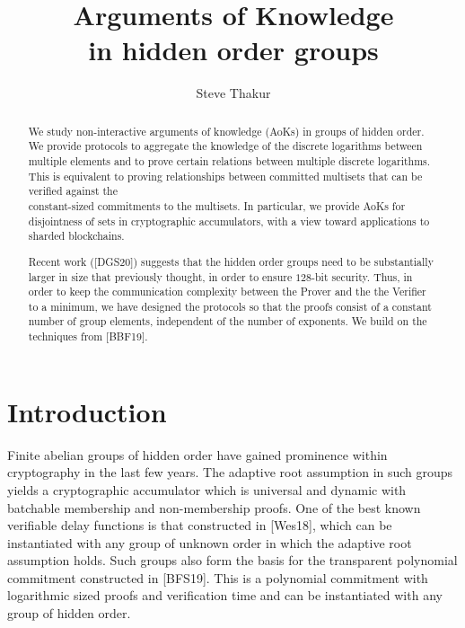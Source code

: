 \documentclass[11pt, lettersize, notitlepage, leqno, footskip=0.6cm]{article}
\numberwithin{equation}{section}
\begin{document}
 
\title{Arguments of Knowledge\\ in hidden order groups}
\author{Steve Thakur}
\affil{}
\date{\vspace{-6ex}}
 
\maketitle

\begin{abstract} We study non-interactive arguments of knowledge (AoKs) in groups of hidden order. We provide protocols to aggregate the knowledge of the discrete logarithms between multiple elements and to prove certain relations between multiple discrete logarithms. This is equivalent to proving relationships between committed multisets that can be verified against the\\ constant-sized commitments to the multisets. In particular, we provide AoKs for disjointness of sets in cryptographic accumulators, with a view toward applications to sharded blockchains. 

Recent work ([DGS20]) suggests that the hidden order groups need to be substantially larger in size that previously thought, in order to ensure $128$-bit security. Thus, in order to keep the communication complexity between the Prover and the the Verifier to a minimum, we have designed the protocols so that the proofs consist of a constant number of group elements, independent of the number of exponents. We build on the techniques from [BBF19].\end{abstract}

\section{\fontsize{12}{12}\selectfont Introduction  }


Finite abelian groups of hidden order have gained prominence within cryptography in the last few years. The adaptive root assumption in such groups yields a cryptographic accumulator which is universal and dynamic with batchable membership and non-membership proofs. One of the best known verifiable delay functions is that constructed in [Wes18], which can be instantiated with any group of unknown order in which the adaptive root assumption holds. Such groups also form the basis for the transparent polynomial commitment constructed in [BFS19]. This is a polynomial commitment with logarithmic sized proofs and verification time and can be instantiated with any group of hidden order.
\end{document}
